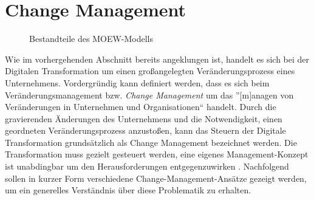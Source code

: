 \section{Change Management}
\label{background:change}

\begin{figure}[h]
	\centering
	\caption[Bestandteile des MOEW-Modells]{Bestandteile des MOEW-Modells \protect \cite[S. 12]{kaune_change_2016}}
	\label{fig:moew}
\end{figure}

Wie im vorhergehenden Abschnitt bereits angeklungen ist, handelt es sich bei der Digitalen Transformation um einen großangelegten Veränderungsprozess eines Unternehmens. Vordergründig kann definiert werden, dass es sich beim Veränderungsmanagement bzw. \textit{Change Management} um das ''$\lbrack$m$\rbrack$anagen von Veränderungen in Unternehmen und Organisationen`` \cite[S. 10]{kaune_change_2016} handelt. Durch die gravierenden Änderungen des Unternehmens und die Notwendigkeit, einen geordneten Veränderungsprozess anzustoßen, kann das Steuern der Digitale Transformation grundsätzlich als Change Management bezeichnet werden. Die Transformation muss gezielt gesteuert werden, eine eigenes Management-Konzept ist unabdingbar um den Herausforderungen entgegenzuwirken \cite[S. 19]{hess_digitale_2019}. Nachfolgend sollen in kurzer Form verschiedene Change-Management-Ansätze gezeigt werden, um ein generelles Verständnis über diese Problematik zu erhalten.


